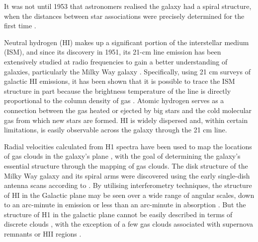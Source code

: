 {It was not until 1953 that astronomers realised the galaxy had a spiral structure, when the distances between star associations were precisely determined for the first time \cite{unsold2002structure}. 



Neutral hydrogen (HI) makes up a significant portion of the interstellar medium (ISM), and since its discovery in 1951, its 21-cm line emission has been extensively studied at radio frequencies to gain a better understanding of galaxies, particularly the Milky Way galaxy \cite{storey199421}.
Specifically, using 21 cm surveys of  galactic HI emissions, it has been shown that it is possible to trace the ISM structure in part because the brightness temperature of the line is directly proportional to the column density of gas \cite{crovisier1983spatial}. 
Atomic hydrogen serves as a connection between the gas heated or ejected by big stars and the cold molecular gas from which new stars are formed. HI is widely dispersed and, within certain limitations, is easily observable across the galaxy through the 21 cm line.



Radial velocities calculated from H1 spectra have been used to map the locations of gas clouds in the galaxy's plane \cite{hossain2018salsa}, with the goal of determining the galaxy's essential structure through the mapping of gas clouds. The disk structure of the Milky Way galaxy and its spiral arms were discovered using the early single-dish antenna scans according to \cite{dickey2001southern,mcclure2001southern}.
By utilising interferometry techniques, the structure of HI in the Galactic plane may be seen over a wide range of angular scales, down to an arc-minute in emission or less than an arc-minute in absorption  \cite{deshpande2000power,crovisier1985observation,kalberla1985high} . But the structure of H1 in the galactic plane cannot be easily described in terms of discrete clouds \cite{deshpande2000power, clark1965interferometer, clark1962hydrogen}, with the exception of a few gas clouds associated with supernova remnants or HII regions \cite {green1993power, sturner1994association, routledge1991structure}. 

}
